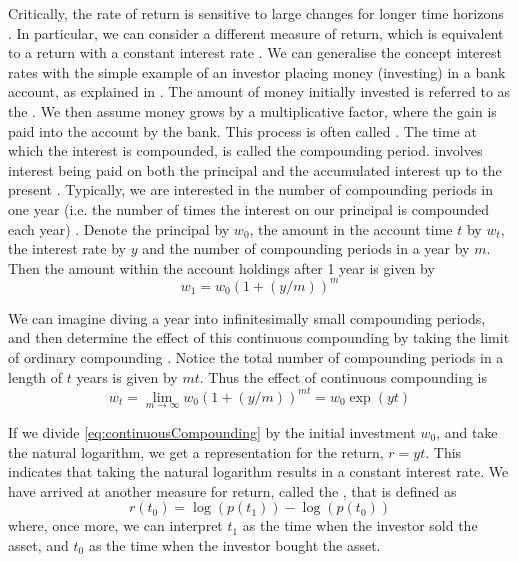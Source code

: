 Critically, the rate of return is sensitive to large changes for longer time horizons \cite{Onn02}. In particular, we can consider a different measure of return, which is equivalent to a return with a constant interest rate \cite{Onn02}. We can generalise the concept interest rates with the simple example of an investor placing money (investing) in a bank account, as explained in \cite{Kuh12c,Lue98}.
The amount of money initially invested is referred to as the . We then assume money grows by a multiplicative factor, where the gain is paid into the account by the bank. This process is often called . The time at which the interest is compounded, is called the compounding period.
 involves interest being paid on both the principal and the accumulated interest up to the present \cite{Onn02}. Typically, we are interested in the number of compounding periods in one year (i.e. the number of times the interest on our principal is compounded each year) \cite{Kuh12c}. Denote the principal by $w_{0}$, the amount in the account time $t$ by $w_{t}$, the interest rate by $y$ and the number of compounding periods in a year by $m$. Then the amount within the account holdings after 1 year is given by
\begin{equation}
	\label{eq:compoundInterest}
	w_{1} = w_{0} (1 + (y/m))^{m}
\end{equation}

We can imagine diving a year into infinitesimally small compounding periods, and then determine the effect of this continuous compounding by taking the limit of ordinary compounding \cite{Lue98}. Notice the total number of compounding periods in a length of $t$ years is given by $mt$. Thus the effect of continuous compounding is
\begin{equation}
	\label{eq:continuousCompounding}
	w_{t} = \lim_{m {\to} \infty} w_{0}(1 + (y/m))^{mt} = w_{0}\exp(yt)
\end{equation}

If we divide \cref{eq:continuousCompounding} by the initial investment $w_{0}$, and take the natural logarithm, we get a representation for the return, $r = yt$. This indicates that taking the natural logarithm results in a constant interest rate.
We have arrived at another measure for return, called the , that is defined as
\begin{equation}
	\label{eq:logarithmicReturn}
	r(t_{0}) = \log(p(t_{1})) - \log(p(t_{0}))
\end{equation}
where, once more, we can interpret $t_{1}$ as the time when the investor sold the asset, and $t_{0}$ as the time when the investor bought the asset.

